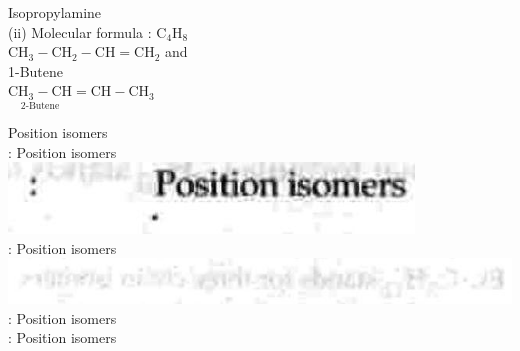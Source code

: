 \documentclass[10pt]{article}
\begin{document}
Isopropylamine\\
(ii) Molecular formula : $\mathrm{C}_{4} \mathrm{H}_{8}$\\
$\mathrm{CH}_{3}-\mathrm{CH}_{2}-\mathrm{CH}=\mathrm{CH}_{2}$ and\\
1-Butene\\
$\underset{\text { 2-Butene }}{\mathrm{CH}_{3}-\mathrm{CH}}=\mathrm{CH}-\mathrm{CH}_{3}$

Position isomers\\
: Position isomers\\
\includegraphics[max width=\textwidth, center]{2025_01_28_8470952b98110cec3aabg-040(1)}\\
: Position isomers\\
\includegraphics[max width=\textwidth, center]{2025_01_28_8470952b98110cec3aabg-040}\\
: Position isomers\\
: Position isomers
\end{document}

